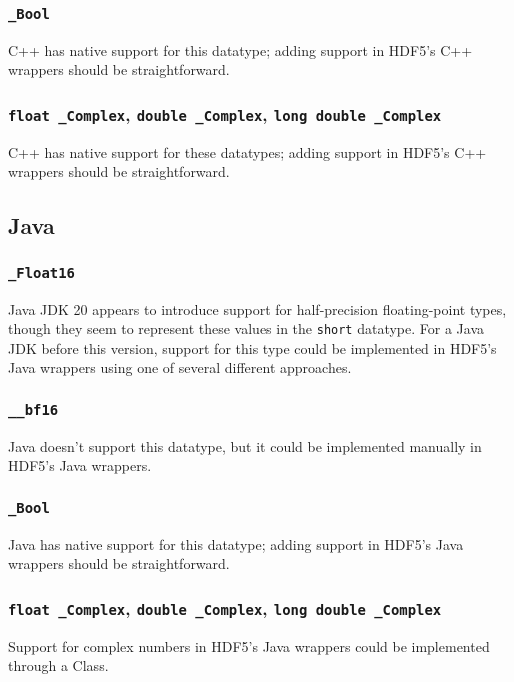 \documentclass[../HDF5_RFC.tex]{subfiles}
\begin{document}
\subsubsection{\texttt{\_Bool}}

C++ has native support for this datatype; adding support in HDF5's C++ wrappers should be straightforward.

\subsubsection{\texttt{float \_Complex}, \texttt{double \_Complex}, \texttt{long double \_Complex}}

C++ has native support for these datatypes; adding support in HDF5's C++ wrappers should be straightforward.

\subsection{Java}

\subsubsection{\texttt{\_Float16}}

Java JDK 20 appears to introduce support for half-precision floating-point types, though they
seem to represent these values in the \texttt{short} datatype. For a Java JDK before this version,
support for this type could be implemented in HDF5's Java wrappers using one of several different
approaches.

\subsubsection{\texttt{\_\_bf16}}

Java doesn't support this datatype, but it could be implemented manually in HDF5's Java wrappers.

\subsubsection{\texttt{\_Bool}}

Java has native support for this datatype; adding support in HDF5's Java wrappers should be straightforward.

\subsubsection{\texttt{float \_Complex}, \texttt{double \_Complex}, \texttt{long double \_Complex}}

Support for complex numbers in HDF5's Java wrappers could be implemented through a Class.
\end{document}
